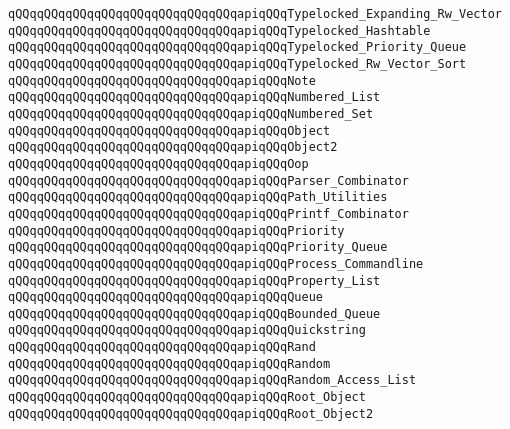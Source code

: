 \verb|qQQqqQQqqQQqqQQqqQQqqQQqqQQqqQQqapiqQQqTypelocked_Expanding_Rw_Vector|\newline
\verb|qQQqqQQqqQQqqQQqqQQqqQQqqQQqqQQqapiqQQqTypelocked_Hashtable|\newline
\verb|qQQqqQQqqQQqqQQqqQQqqQQqqQQqqQQqapiqQQqTypelocked_Priority_Queue|\newline
\verb|qQQqqQQqqQQqqQQqqQQqqQQqqQQqqQQqapiqQQqTypelocked_Rw_Vector_Sort|\newline
\verb|qQQqqQQqqQQqqQQqqQQqqQQqqQQqqQQqapiqQQqNote|\newline
\verb|qQQqqQQqqQQqqQQqqQQqqQQqqQQqqQQqapiqQQqNumbered_List|\newline
\verb|qQQqqQQqqQQqqQQqqQQqqQQqqQQqqQQqapiqQQqNumbered_Set|\newline
\verb|qQQqqQQqqQQqqQQqqQQqqQQqqQQqqQQqapiqQQqObject|\newline
\verb|qQQqqQQqqQQqqQQqqQQqqQQqqQQqqQQqapiqQQqObject2|\newline
\verb|qQQqqQQqqQQqqQQqqQQqqQQqqQQqqQQqapiqQQqOop|\newline
\verb|qQQqqQQqqQQqqQQqqQQqqQQqqQQqqQQqapiqQQqParser_Combinator|\newline
\verb|qQQqqQQqqQQqqQQqqQQqqQQqqQQqqQQqapiqQQqPath_Utilities|\newline
\verb|qQQqqQQqqQQqqQQqqQQqqQQqqQQqqQQqapiqQQqPrintf_Combinator|\newline
\verb|qQQqqQQqqQQqqQQqqQQqqQQqqQQqqQQqapiqQQqPriority|\newline
\verb|qQQqqQQqqQQqqQQqqQQqqQQqqQQqqQQqapiqQQqPriority_Queue|\newline
\verb|qQQqqQQqqQQqqQQqqQQqqQQqqQQqqQQqapiqQQqProcess_Commandline|\newline
\verb|qQQqqQQqqQQqqQQqqQQqqQQqqQQqqQQqapiqQQqProperty_List|\newline
\verb|qQQqqQQqqQQqqQQqqQQqqQQqqQQqqQQqapiqQQqQueue|\newline
\verb|qQQqqQQqqQQqqQQqqQQqqQQqqQQqqQQqapiqQQqBounded_Queue|\newline
\verb|qQQqqQQqqQQqqQQqqQQqqQQqqQQqqQQqapiqQQqQuickstring|\newline
\verb|qQQqqQQqqQQqqQQqqQQqqQQqqQQqqQQqapiqQQqRand|\newline
\verb|qQQqqQQqqQQqqQQqqQQqqQQqqQQqqQQqapiqQQqRandom|\newline
\verb|qQQqqQQqqQQqqQQqqQQqqQQqqQQqqQQqapiqQQqRandom_Access_List|\newline
\verb|qQQqqQQqqQQqqQQqqQQqqQQqqQQqqQQqapiqQQqRoot_Object|\newline
\verb|qQQqqQQqqQQqqQQqqQQqqQQqqQQqqQQqapiqQQqRoot_Object2|\newline

